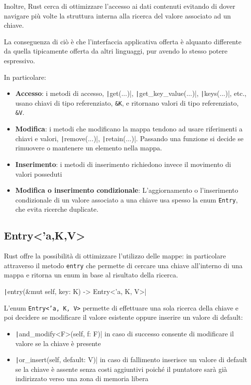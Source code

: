 Inoltre, Rust cerca di ottimizzare l'accesso ai dati contenuti evitando di dover
navigare più volte la struttura interna alla ricerca del valore associato ad un
chiave.

La conseguenza di ciò è che l'interfaccia applicativa offerta è alquanto
differente da quella tipicamente offerta da altri linguaggi, pur avendo lo
stesso potere espressivo.

In particolare:


\begin{itemize}
  \item \textbf{Accesso}: i metodi di accesso, \texttt|get(...)|, \texttt|get_key_value(...)|,
        \texttt|keys(...)|, etc., usano chiavi di tipo referenziato, \texttt{\&K},
        e ritornano valori di tipo referenziato, \texttt{\&V}.
  \item \textbf{Modifica}: i metodi che modificano la mappa tendono ad usare riferimenti a chiavi e valori, \texttt|remove(...)|, \texttt|retain(...)|. Passando una funzione si decide se rimuovere o mantenere un elemento nella mappa.
  \item \textbf{Inserimento}: i metodi di inserimento richiedono invece il movimento di valori posseduti
  \item \textbf{Modifica o inserimento condizionale}: L'aggiornamento o
        l'inserimento condizionale di un valore associato a una chiave usa spesso la
        enum \texttt{Entry}, che evita ricerche duplicate.
\end{itemize}


\subsection{Entry<'a,K,V>}
Rust offre la possibilità di ottimizzare l'utilizzo delle mappe: in particolare
attraverso il metodo \texttt{entry} che permette di cercare una chiave
all'interno di una mappa e ritorna un enum in base al risultato della ricerca.

\begin{center}
  \texttt|entry(&mut self, key: K) -> Entry<'a, K, V>|
\end{center}

L'enum \texttt{Entry<'a, K, V>} permette di effettuare una sola ricerca della
chiave e poi decidere se modificare il valore esistente oppure inserire un
valore di default:

\begin{itemize}
  \item \texttt|and_modify<F>(self, f: F)| in caso di successo
        consente di modificare il valore se la chiave è presente
  \item \texttt|or_insert(self, default: V)| in caso di fallimento
        inserisce un valore di default se la chiave è assente senza costi aggiuntivi poiché il puntatore
        sarà già indirizzato verso una zona di memoria libera
\end{itemize}


